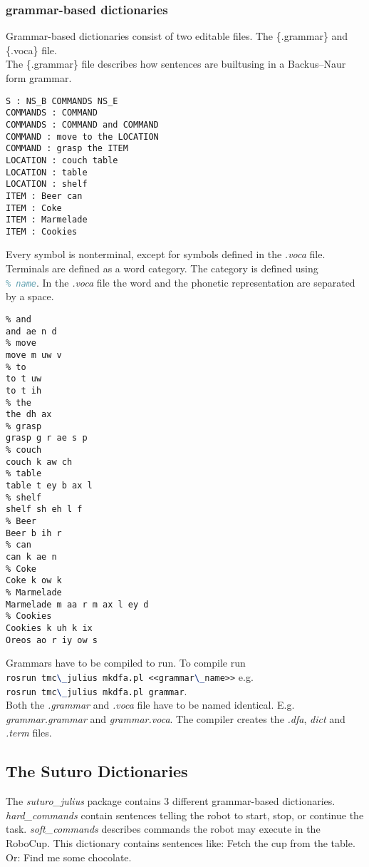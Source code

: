 \documentclass[main.tex]{subfiles}
\begin{document}
    \subsubsection{grammar-based dictionaries}
        Grammar-based dictionaries consist of two editable files. The \{.grammar\} and \{.voca\} file.\\
        The \{.grammar\} file describes how sentences are builtusing in a Backus–Naur form grammar.\\
        \begin{lstlisting}
S : NS_B COMMANDS NS_E
COMMANDS : COMMAND
COMMANDS : COMMAND and COMMAND
COMMAND : move to the LOCATION
COMMAND : grasp the ITEM
LOCATION : couch table
LOCATION : table
LOCATION : shelf
ITEM : Beer can
ITEM : Coke
ITEM : Marmelade
ITEM : Cookies
        \end{lstlisting}
        Every symbol is nonterminal, except for symbols defined in the \textit{.voca} file. Terminals are defined as a word category. The category is defined using\\ \lstinline[language=TeX]|% name|. \newline
        In the \textit{.voca} file the word and the phonetic representation are separated by a space.
        \begin{lstlisting}
% and
and ae n d
% move
move m uw v
% to
to t uw
to t ih
% the
the dh ax
% grasp
grasp g r ae s p
% couch
couch k aw ch
% table
table t ey b ax l
% shelf
shelf sh eh l f
% Beer
Beer b ih r
% can
can k ae n
% Coke
Coke k ow k
% Marmelade
Marmelade m aa r m ax l ey d
% Cookies
Cookies k uh k ix
Oreos ao r iy ow s
        \end{lstlisting}
        
        Grammars have to be compiled to run. To compile run\\
        \lstinline[language=TeX]|rosrun tmc\_julius mkdfa.pl <<grammar\_name>>| e.g.\\ \lstinline[language=TeX]|rosrun tmc\_julius mkdfa.pl grammar|.\\
        Both the \textit{.grammar} and \textit{.voca} file have to be named identical. E.g. \textit{grammar.grammar} and \textit{grammar.voca}. The compiler creates the \textit{.dfa}, \textit{dict} and \textit{.term} files.	
    
    \subsection{The Suturo Dictionaries}
        The \textit{suturo\_julius} package contains 3 different grammar-based dictionaries. \textit{hard\_commands} contain sentences telling the robot to start, stop, or continue the task.
        \textit{soft\_commands} describes commands the robot may execute in the RoboCup. This dictionary contains sentences like: Fetch the cup from the table. Or: Find me some chocolate.
\end{document}
